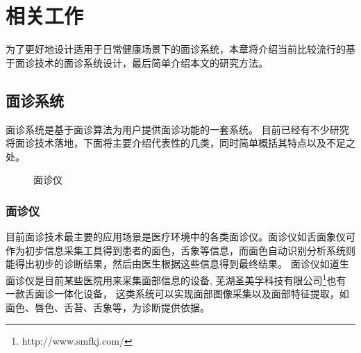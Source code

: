 \chapter{相关工作}

为了更好地设计适用于日常健康场景下的面诊系统，本章将介绍当前比较流行的基于面诊技术的面诊系统设计，最后简单介绍本文的研究方法。

\section{面诊系统}

面诊系统是基于面诊算法为用户提供面诊功能的一套系统。
目前已经有不少研究将面诊技术落地，下面将主要介绍代表性的几类，同时简单概括其特点以及不足之处。

\begin{figure}[h]
    \centering
    \caption{面诊仪}
    \label{fig:med}
\end{figure}

\subsection{面诊仪}
目前面诊技术最主要的应用场景是医疗环境中的各类面诊仪。面诊仪如舌面象仪可作为初步信息采集工具得到患者的面色，舌象等信息，而面色自动识别分析系统则能得出初步的诊断结果，然后由医生根据这些信息得到最终结果\cite{崔骥2018人工智能背景下中医诊疗技术的应用与展望}。
面诊仪如道生面诊仪\cite{邸丹2016手持式舌象仪的研制}是目前某些医院用来采集面部信息的设备, 芜湖圣美孚科技有限公司\footnote{http://www.smfkj.com/}也有一款舌面诊一体化设备，
这类系统可以实现面部图像采集以及面部特征提取，如面色、唇色、舌苔、舌象等，为诊断提供依据。


